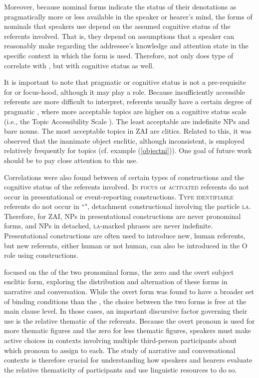 Moreover, because nominal forms indicate the status of their denotations as pragmatically more or less available in the speaker or hearer's mind, the forms of nominals that speakers use depend on the assumed cognitive status of the referents involved. That is, they depend on assumptions that a speaker can reasonably make regarding the addressee's knowledge and attention state in the specific context in which the form is used. Therefore, not only does type of  correlate with , but with cognitive status as well. 

It is important to note that pragmatic or cognitive status is not a pre-requisite for  or focus-hood, although it may play a role. Because insufficiently accessible  referents are more difficult to interpret,  referents usually have a certain degree of pragmatic , where more acceptable topics are higher on a cognitive status scale (i.e., the Topic Accessibility Scale \citep{lambrecht1994}). The least acceptable are indefinite NPs and bare nouns. The most acceptable topics in ZAI are clitics. Related to this, it was observed that the inanimate object enclitic, although inconsistent, is employed relatively frequently for topics (cf. example (\ref{objectni})). One goal of future work should be to pay close attention to this use.

Correlations were also found between  of certain types of constructions and the cognitive status of the referents involved. \textsc{In focus} \citep{gundel1993} or \textsc{activated} referents do not occur in presentational or event-reporting constructions. \textsc{Type identifiable} referents do not occur in ``", detachment constructional involving the particle \textsc{la}. Therefore, for ZAI, NPs in presentational constructions are never pronominal forms, and NPs in detached, \textsc{la}-marked phrases are never indefinite. Presentational constructions are often used to introduce new, human referents, but new referents, either human or not human, can also be introduced in the O role using  constructions.

 focused on the  of the two  pronominal forms, the zero and the overt subject enclitic form, exploring the distribution and alternation of these forms in narrative and conversation. While the overt form was found to have a broader set of binding conditions than the , the choice between the two forms is free at the main clause level. In those cases, an important discursive factor governing their use is the relative thematic  of the referents. Because the overt pronoun is used for more thematic figures and the zero for less thematic figures, speakers must make active choices in contexts involving multiple third-person participants about which pronoun to assign to each. The study of narrative and conversational contexts is therefore crucial for understanding how speakers and hearers evaluate the relative thematicity of participants and use linguistic resources to do so.

